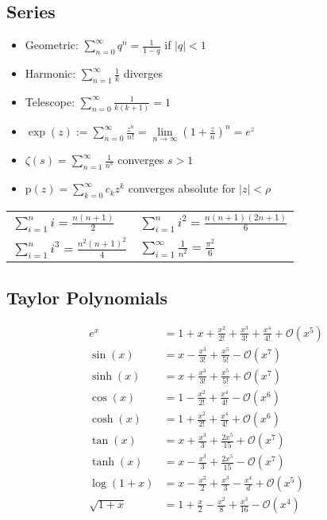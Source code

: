 \documentclass[a4paper, 10pt]{article}
\theoremstyle{definition}
\theoremstyle{named}
\newcommand{\BO}{\mathcal{O}}
\begin{document}
\subsection*{Series}
\begin{itemize}
    \item Geometric: $\sum_{n = 0}^\infty q^n = \frac{1}{1 - q}$ if $|q| < 1$
    \item Harmonic: $\sum_{n = 1}^\infty \frac{1}{k}$ diverges
    \item Telescope: $\sum_{n = 0}^\infty \frac{1}{k(k + 1)} = 1$
    \item $\exp(z) := \sum_{n = 0}^\infty \frac{z^n}{n!} = \underset{n \to \infty}{\lim}(1 + \frac{z}{n})^n = e^z$
    \item $\zeta(s) = \sum_{n=1}^\infty \frac{1}{n^s}$ converges $s > 1$
    \item $\text{p}(z) = \sum_{k = 0}^\infty c_kz^k$ converges absolute for $|z| < \rho$
\end{itemize}
\begin{tabularx}{\linewidth}{XX}
    \toprule
    $\sum\limits_{i=1}^n i = \frac{n(n+1)}{2}$ & $\sum\limits_{i=1}^n i^2 = \frac{n(n+1)(2n + 1)}{6}$ \\
    $\sum\limits_{i=1}^n i^3 = \frac{n^2(n+1)^2}{4}$ & $\sum\limits_{i=1}^\infty \frac{1}{n^2} = \frac{\pi^2}{6}$ \\
    \bottomrule
\end{tabularx}

\subsection*{Taylor Polynomials}
\begin{align*}
    e^x &= 1 + x + \frac{x^2}{2!} + \frac{x^3}{3!} + \frac{x^4}{4!} + \BO(x^5) \\
    \sin(x) &= x - \frac{x^3}{3!} + \frac{x^5}{5!} - \BO(x^7) \\
    \sinh(x) &= x + \frac{x^3}{3!} + \frac{x^5}{5!} + \BO(x^7) \\
    \cos(x) &= 1 - \frac{x^2}{2!} + \frac{x^4}{4!} - \BO(x^6) \\
    \cosh(x) &= 1 + \frac{x^2}{2!} + \frac{x^4}{4!} + \BO(x^6) \\
    \tan(x) &= x + \frac{x^3}{3} + \frac{2x^5}{15} + \BO(x^7) \\
    \tanh(x) &= x - \frac{x^3}{3} + \frac{2x^5}{15} - \BO(x^7) \\
    \log(1+x) &= x - \frac{x^2}{2} + \frac{x^3}{3} - \frac{x^4}{d} + \BO(x^5) \\
    \sqrt{1 + x} &= 1 + \frac{x}{2} - \frac{x^2}{8} + \frac{x^3}{16} - \BO(x^4)
\end{align*}
\end{document}
